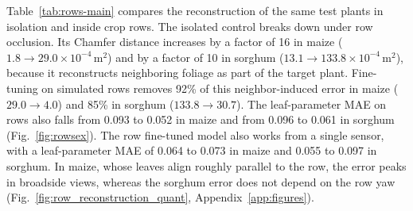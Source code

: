 \documentclass[10pt,twocolumn,letterpaper]{article}
\begin{document}
\begin{table}[t]
  \caption{\textbf{The same test plants in isolation and in simulated crop rows} (2{,}250 test plants per species, ten row orientations). Chamfer distance to the target plant is in $10^{-4}\,\mathrm{m}^2$, and MAE is the leaf-parameter MAE on rows. Table~\ref{tab:rows} gives all inputs with confidence intervals.}
  \label{tab:rows-main}
  \centering\scriptsize
  \setlength{\tabcolsep}{3pt}
\end{table}

Table~\ref{tab:rows-main} compares the reconstruction of the same test plants in isolation and inside crop rows. The isolated control breaks down under row occlusion. Its Chamfer distance increases by a factor of 16 in maize ($1.8 \to 29.0 \times 10^{-4}\,\mathrm{m}^2$) and by a factor of 10 in sorghum ($13.1 \to 133.8 \times 10^{-4}\,\mathrm{m}^2$), because it reconstructs neighboring foliage as part of the target plant. Fine-tuning on simulated rows removes 92\% of this neighbor-induced error in maize ($29.0 \to 4.0$) and 85\% in sorghum ($133.8 \to 30.7$). The leaf-parameter MAE on rows also falls from 0.093 to 0.052 in maize and from 0.096 to 0.061 in sorghum (Fig.~\ref{fig:rowsex}). The row fine-tuned model also works from a single sensor, with a leaf-parameter MAE of 0.064 to 0.073 in maize and 0.055 to 0.097 in sorghum. In maize, whose leaves align roughly parallel to the row, the error peaks in broadside views, whereas the sorghum error does not depend on the row yaw (Fig.~\ref{fig:row_reconstruction_quant}, Appendix~\ref{app:figures}).
\end{document}
